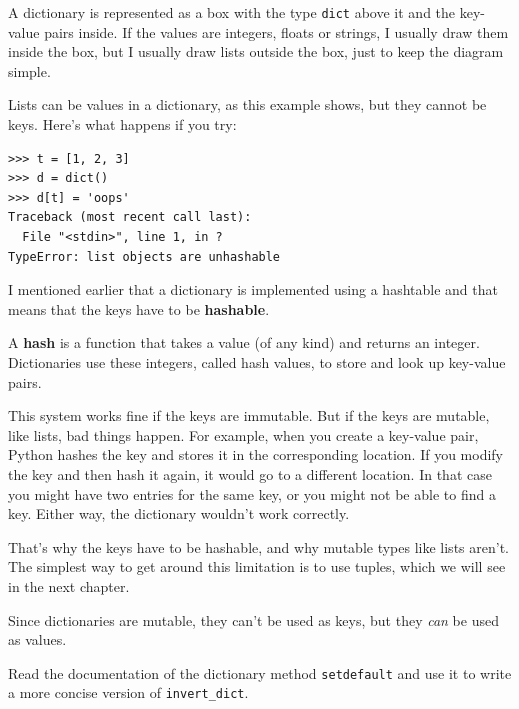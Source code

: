 \documentclass[10pt]{book}
\begin{document}
A dictionary is represented as a box with the type {\tt dict} above it
and the key-value pairs inside.  If the values are integers, floats or
strings, I usually draw them inside the box, but I usually draw lists
outside the box, just to keep the diagram simple.

Lists can be values in a dictionary, as this example shows, but they
cannot be keys.  Here's what happens if you try:



\beforeverb
\begin{verbatim}
>>> t = [1, 2, 3]
>>> d = dict()
>>> d[t] = 'oops'
Traceback (most recent call last):
  File "<stdin>", line 1, in ?
TypeError: list objects are unhashable
\end{verbatim}
\afterverb
%
I mentioned earlier that a dictionary is implemented using
a hashtable and that means that the keys have to be {\bf hashable}.


A {\bf hash} is a function that takes a value (of any kind)
and returns an integer.  Dictionaries use these integers,
called hash values, to store and look up key-value pairs.


This system works fine if the keys are immutable.  But if the
keys are mutable, like lists, bad things happen.  For example,
when you create a key-value pair, Python hashes the key and 
stores it in the corresponding location.  If you modify the
key and then hash it again, it would go to a different location.
In that case you might have two entries for the same key,
or you might not be able to find a key.  Either way, the
dictionary wouldn't work correctly.

That's why the keys have to be hashable, and why mutable types like
lists aren't.  The simplest way to get around this limitation is to
use tuples, which we will see in the next chapter.

Since dictionaries are mutable, they can't be used as keys,
but they {\em can} be used as values.

\begin{ex}
Read the documentation of the dictionary method {\tt setdefault}
and use it to write a more concise version of \verb"invert_dict".


\end{ex}
\end{document}
